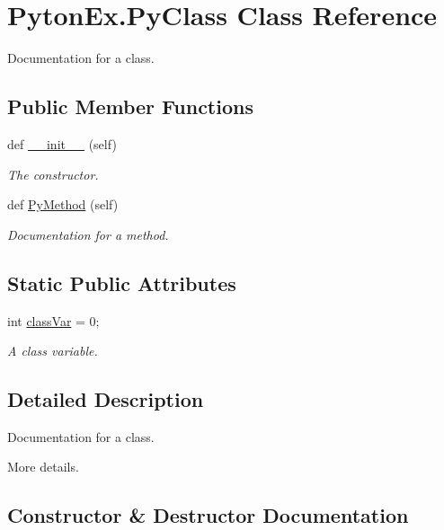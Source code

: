 \hypertarget{class_pyton_ex_1_1_py_class}{}\section{Pyton\+Ex.\+Py\+Class Class Reference}
\label{class_pyton_ex_1_1_py_class}


Documentation for a class.  


\subsection*{Public Member Functions}
\begin{DoxyCompactItemize}
\item 
def \mbox{\hyperlink{class_pyton_ex_1_1_py_class_a6721e6ffdf5ada60d9e862b7ec8ed846}{\+\_\+\+\_\+init\+\_\+\+\_\+}} (self)
\begin{DoxyCompactList}\small\item\em The constructor. \end{DoxyCompactList}\item 
def \mbox{\hyperlink{class_pyton_ex_1_1_py_class_a7dde6279efa8bda01061ac2a00e229ab}{Py\+Method}} (self)
\begin{DoxyCompactList}\small\item\em Documentation for a method. \end{DoxyCompactList}\end{DoxyCompactItemize}
\subsection*{Static Public Attributes}
\begin{DoxyCompactItemize}
\item 
int \mbox{\hyperlink{class_pyton_ex_1_1_py_class_afb9799b2759973a1b079f4da0f0242a3}{class\+Var}} = 0;
\begin{DoxyCompactList}\small\item\em A class variable. \end{DoxyCompactList}\end{DoxyCompactItemize}


\subsection{Detailed Description}
Documentation for a class. 

More details. 

\subsection{Constructor \& Destructor Documentation}
\mbox{\label{class_pyton_ex_1_1_py_class_a6721e6ffdf5ada60d9e862b7ec8ed846}} 
